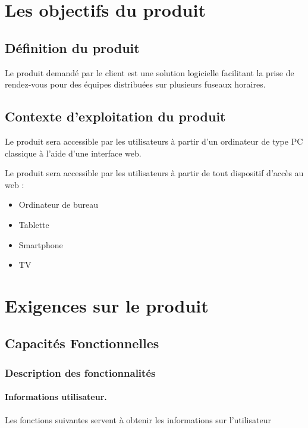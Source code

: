 \documentclass[majeure,gl]{tb}
\begin{document}
\section{Les objectifs du produit}

\subsection{Définition du produit}

Le produit demandé par le client est une solution logicielle
facilitant la prise de rendez-vous pour des équipes distribuées sur
plusieurs fuseaux horaires.

\subsection{Contexte d'exploitation du produit}
Le produit sera accessible par les utilisateurs à partir d'un
ordinateur de type PC classique à l'aide d'une interface web.

Le produit sera accessible par les utilisateurs à partir de tout
dispositif d'accès au web :

\begin{itemize}
  \item Ordinateur de bureau
  \item Tablette
  \item Smartphone
  \item TV
\end{itemize}


\section{Exigences sur le produit}
\label{sec:exigence}

\subsection{Capacités Fonctionnelles}
\label{fonc}

\subsubsection{Description des fonctionnalités}

\paragraph{Informations utilisateur.} Les fonctions suivantes servent à obtenir les informations sur l'utilisateur
\end{document}
